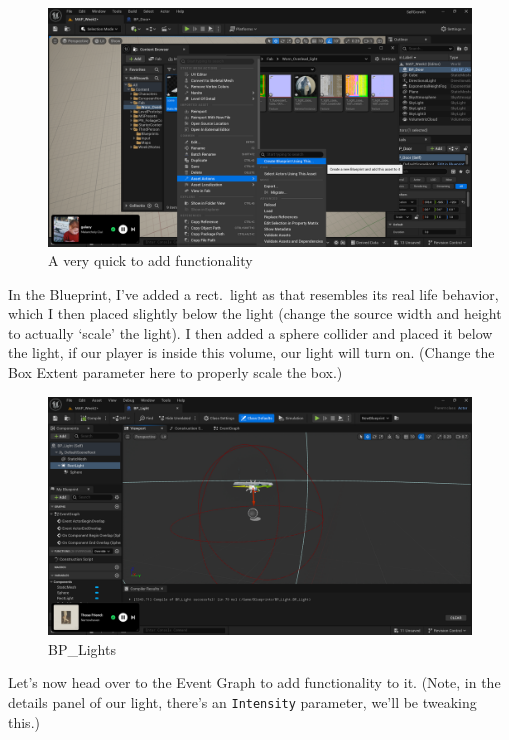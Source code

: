 \documentclass[]{article}
\begin{document}
	\begin{figure}[h]
		\centering
		\includegraphics[width=1\linewidth]{day4images/screenshot013}
		\caption{A very quick to add functionality}
		\label{fig:screenshot013}
	\end{figure}
		\newpage
	In the Blueprint, I've added a rect.\ light as that resembles its real life behavior, which I then placed slightly below the light (change the source width and height to actually `scale' the light). I then added a sphere collider and placed it below the light, if our player is inside this volume, our light will turn on. (Change the Box Extent parameter here to properly scale the box.)
	
	\begin{figure}[h]
		\centering
		\includegraphics[width=1\linewidth]{day4images/screenshot015}
		\caption{BP\_Lights}
		\label{fig:screenshot015}
	\end{figure}

	Let's now head over to the Event Graph to add functionality to it. (Note, in the details panel of our light, there's an \verb*|Intensity| parameter, we'll be tweaking this.)
	
\end{document}
